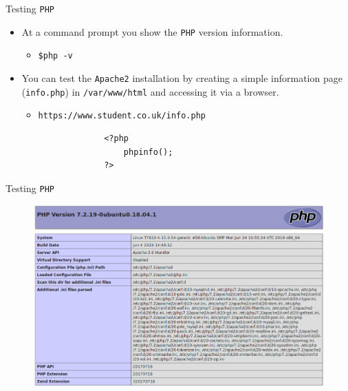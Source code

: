 \documentclass[xcolor=table]{beamer}
\begin{document}
\begin{frame}[fragile]{Testing \texttt{PHP}}
  \begin{itemize}
     \item At a command prompt you show the \texttt{PHP} version information.
       \begin{itemize}
         \item \texttt{\$php -v}
       \end{itemize}
    \item You can test the \texttt{Apache2} installation by creating a simple information page (\texttt{info.php}) in \texttt{/var/www/html} and accessing it via a browser.
      \begin{itemize}
        \item \texttt{https://www.student.co.uk/info.php}
      \end{itemize}
  \end{itemize}
  \begin{tcolorbox}
    \lstset{
      basicstyle=\scriptsize\ttfamily,
    }
\begin{lstlisting}
                    <?php 
                        phpinfo(); 
                    ?>
\end{lstlisting}
  \end{tcolorbox}
\end{frame}

\begin{frame}{Testing \texttt{PHP}}
  \begin{figure}
    \begin{center}
      \includegraphics[width=1\linewidth]{phpinfo.png}
    \end{center}
  \end{figure}
\end{frame}
\end{document}
